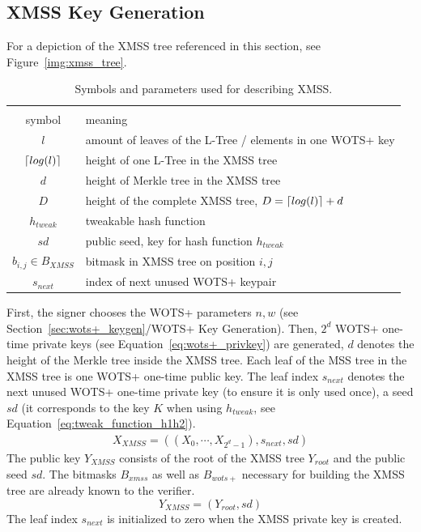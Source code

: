 \subsection{XMSS Key Generation}
For a depiction of the XMSS tree referenced in this section, see Figure~\ref{img:xmss_tree}. 

\begin{table}
\begin{center}
\begin{tabular}{c l}
 \hline\noalign{\smallskip}
 \multicolumn{2}{c}{\textbf{XMSS Parameter}} \\
 symbol & meaning \\
 \hline\noalign{\smallskip} 
 $l$ & amount of leaves of the L-Tree / elements in one WOTS+ key  \\ 
 $\lceil log(l)\rceil$ & height of one L-Tree in the XMSS tree \\
 $d$ & height of Merkle tree in the XMSS tree  \\ 
 $D$ & height of the complete XMSS tree, $D = \lceil log(l)\rceil + d$ \\
 $h_{tweak}$ & tweakable hash function \\
 $sd$ & public seed, key for hash function $h_{tweak}$ \\
 $b_{i,j} \in B_{XMSS}$ & bitmask in XMSS tree on position $i,j$ \\
 $s_{next}$ & index of next unused WOTS+ keypair \\
 \hline 
\end{tabular}
\caption{Symbols and parameters used for describing XMSS.}
\label{table:xmms_param}
\end{center}
\end{table}
First, the signer chooses the WOTS+ parameters $n, w$ (see Section~\ref{sec:wots+_keygen}/WOTS+ Key Generation).
Then, $2^d$ WOTS+ one-time private keys (see Equation~\ref{eq:wots+_privkey}) are generated, $d$ denotes the height of the Merkle tree inside the XMSS tree. %
Each leaf of the MSS tree in the XMSS tree is one WOTS+ one-time public key. 
The leaf index $s_{next}$ denotes the next unused WOTS+ one-time private key (to ensure it is only used once), a seed $sd$ (it corresponds to the key $K$ when using $h_{tweak}$, see Equation~\ref{eq:tweak_function_h1h2}).
\begin{align}
\label{eq:xmss_priv_key}
X_{XMSS} = ((X_0, \cdots, X_{2^d-1}), s_{next}, sd)
\end{align}
The public key $Y_{XMSS}$ consists of the root of the XMSS tree $Y_{root}$ and the public seed $sd$. The bitmasks $B_{xmss}$ as well as $B_{wots+}$ necessary for building the XMSS tree are already known to the verifier.
\begin{equation}
\label{eq:xmss_pubkey}
Y_{XMSS} = (Y_{root}, sd)
\end{equation}
The leaf index $s_{next}$ is initialized to zero when the XMSS private key is created.

